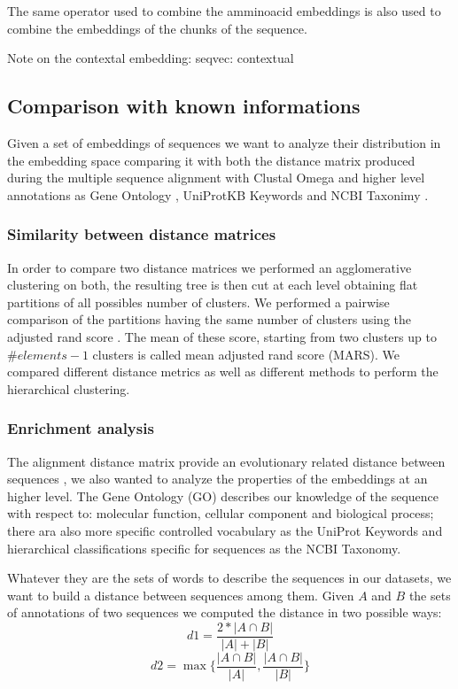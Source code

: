 \documentclass[12pt, letterpaper, twocolumn]{article}
\begin{document}
The same operator used to combine the amminoacid embeddings is also used to combine the embeddings of the chunks of the sequence.

Note on the contextal embedding: seqvec: contextual

\subsection{Comparison with known informations}
Given a set of embeddings of sequences we want to analyze their distribution in the embedding space comparing it with both the distance matrix produced during the multiple sequence alignment with Clustal Omega \cite{sievers2011fast} and higher level annotations as Gene Ontology \cite{10.1093/genetics/iyad031, ashburner2000gene}, UniProtKB Keywords and NCBI Taxonimy \cite{uniprot23}.

\subsubsection{Similarity between distance matrices \label{sec:similarity}}
In order to compare two distance matrices we performed an agglomerative clustering on both, the resulting tree is then cut at each level obtaining flat partitions of all possibles number of clusters. We performed a pairwise comparison of the partitions having the same number of clusters using the adjusted rand score \cite{hubert1985comparing}. The mean of these score, starting from two clusters up to $ \#elements - 1 $ clusters is called mean adjusted rand score (MARS). We compared different distance metrics as well as different methods to perform the hierarchical clustering.  

\subsubsection{Enrichment analysis}
The alignment distance matrix provide an evolutionary related distance between sequences \cite{SOFI202247}, we also wanted to analyze the properties of the embeddings at an higher level. The Gene Ontology (GO) describes our knowledge of the sequence with respect to: molecular function, cellular component and biological process; there ara also more specific controlled vocabulary as the UniProt Keywords and hierarchical classifications specific for sequences as the NCBI Taxonomy.

Whatever they are the sets of words to describe the sequences in our datasets, we want to build a distance between sequences among them. Given $A$ and $B$ the sets of annotations of two sequences we computed the distance in two possible ways: $$d1 = \frac{2 * |A \cap B|}{|A| + |B|} $$ $$d2 = \max\{ \frac{|A \cap B|}{|A|}, \frac{|A \cap B|}{|B|} \} $$
\end{document}
